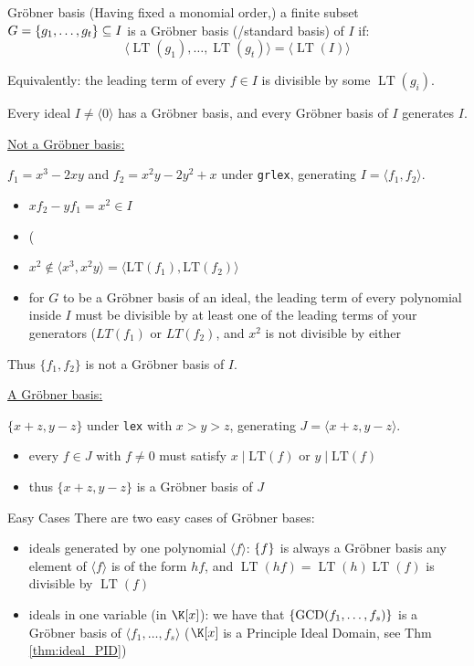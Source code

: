\documentclass[a4paper, 11pt]{report}
\newcommand{\gen}[1]{\langle #1 \rangle}
\newcommand{\LT}{\operatorname{LT}}
\begin{document}
\begin{defframe}{Gr\"obner basis}{}
    (Having fixed a monomial order,) a finite subset $G = \set{g_1, \dots , g_{t}} \subseteq I$ is a Gr\"obner basis (/standard basis) of $I$ if:
    $$ \gen{\LT(g_1), \dots , \LT(g_{t})} = \gen{\LT(I)} $$

    Equivalently: the leading term of every $f \in I$ is divisible by some $\LT(g_{i})$.
\end{defframe}

\begin{corframe}{}
    Every ideal $I \neq \gen{0}$ has a Gr\"obner basis, and every Gr\"obner basis of $I$ generates $I$.
\end{corframe}

\underline{Not a Gr\"obner basis:}


$f_1 = x^3 - 2xy$ and $f_2 = x^2y - 2y^2 + x$ under \texttt{grlex}, generating $I = \langle f_1, f_2 \rangle$.
    \begin{itemize}
        \item $xf_2 - yf_1 = x^2 \in I$ 
        \item (        \item $x^2 \notin \langle x^3, x^2y \rangle = \langle \mathrm{LT}(f_1), \mathrm{LT}(f_2) \rangle$ 
        \item for $G$ to be a Gröbner basis of an ideal, the leading term of every polynomial inside $I$ must be divisible by at least one of the leading terms of your generators ($LT(f_1)$ or $LT(f_2)$, and $x^{2}$ is not divisible by either
    \end{itemize}
    Thus $\{f_1, f_2\}$ is not a Gr\"obner basis of $I$.

    \underline{A Gr\"obner basis:}


$\{x + z, y - z\}$ under \texttt{lex} with $x > y > z$, generating $J = \langle x + z, y - z \rangle$.
    \begin{itemize}
        \item every $f \in J$ with $f \neq 0$ must satisfy $x \mid \mathrm{LT}(f)$ or $y \mid \mathrm{LT}(f)$
        \item thus $\{x + z, y - z\}$ is a Gr\"obner basis of $J$
    \end{itemize}


    \begin{gframe}{Easy Cases}
        There are two easy cases of Gr\"obner bases:
        \begin{itemize}
            \item ideals generated by one polynomial $\gen{f}$: $\set{f}$ is always a Gr\"obner basis
                \subitem any element of $\gen{f}$ is of the form $hf$, and $\LT(hf) = \LT(h)\LT(f)$ is divisible by $\LT(f)$
            \item ideals in one variable (in $\K[x]$): we have that $\set{\text{GCD}(f_1, \dots , f_{s})}$ is a Gr\"obner basis of $\gen{f_1, \dots , f_{s}}$ ($\K[x]$ is a Principle Ideal Domain, see Thm \ref{thm:ideal_PID})
        \end{itemize}
    \end{gframe}
\end{document}

